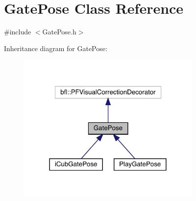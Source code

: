 \hypertarget{classGatePose}{}\section{Gate\+Pose Class Reference}
\label{classGatePose}


{\ttfamily \#include $<$Gate\+Pose.\+h$>$}



Inheritance diagram for Gate\+Pose\+:
\nopagebreak
\begin{figure}[H]
\begin{center}
\leavevmode
\includegraphics[width=258pt]{classGatePose__inherit__graph}
\end{center}
\end{figure}
